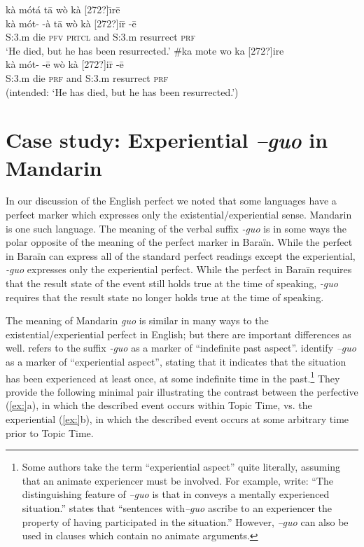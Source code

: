 \ea
\ea  \glll kà  mótá    tā  wò  kà  [272?]\={\i}rē\\
kà  mót-  -à  tā  wò  kà  [272?]i\={r}  -ē\\
S:3.m  die  \textsc{pfv}  \textsc{prtcl}  and  S:3.m  resurrect  \textsc{prf}\\
\glt ‘He died, but he has been resurrected.’
\ex \glll  \#ka  mote    wo  ka  [272?]ire\\
  kà  mót-  -ē  wò  kà  [272?]i\={r}  -ē\\
S:3.m  die  \textsc{prf}  and  S:3.m  resurrect  \textsc{prf}\\
\glt (intended: ‘He has died, but he has been resurrected.’)
\z \z

\section{Case study: Experiential \textit{–guo} in Mandarin}\label{sec:22.6}

In our discussion of the English perfect we noted that some languages have a perfect marker which expresses only the existential/experiential sense. Mandarin is one such language. The meaning of the verbal suffix \textit{-guo} is in some ways the polar opposite of the meaning of the perfect marker in Baraïn. While the perfect in Baraïn can express all of the standard perfect readings except the experiential, \textit{-guo} expresses only the experiential perfect. While the perfect in Baraïn requires that the result state of the event still holds true at the time of speaking, \textit{-guo} requires that the result state no longer holds true at the time of speaking.



The meaning of Mandarin \textit{guo} is similar in many ways to the existential/experiential perfect in English; but there are important differences as well. \citet{Chao1968} refers to the suffix \textit{-guo} as a marker of “indefinite past aspect”. \citet[226]{LiThompson1981} identify \textit{–guo} as a marker of “experiential aspect”, stating that it indicates that the situation has been experienced at least once, at some indefinite time in the past.\footnote{Some authors take the term “experiential aspect” quite literally, assuming that an animate experiencer must be involved. For example, \citet[144]{XiaoMcEnery2004} write: “The distinguishing feature of \textit{–guo} is that in conveys a mentally experienced situation.” \citet[267]{Smith1997} states that “sentences with\textit{–guo} ascribe to an experiencer the property of having participated in the situation.” However, \textit{–guo} can also be used in clauses which contain no animate arguments.} They provide the following minimal pair illustrating the contrast between the perfective (\ref{ex:}a), in which the described event occurs within Topic Time, vs. the experiential (\ref{ex:}b), in which the described event occurs at some arbitrary time prior to Topic Time.



